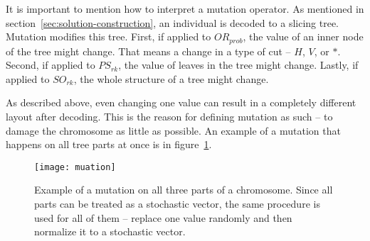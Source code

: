 It is important to mention how to interpret a mutation operator.
As mentioned in section~\ref{sec:solution-construction}, an individual is decoded to a slicing tree.
Mutation modifies this tree.
First, if applied to $OR_{prob}$, the value of an inner node of the tree might change.
That means a change in a type of cut – $H$, $V$, or $*$.
Second, if applied to $PS_{rk}$, the value of leaves in the tree might change.
Lastly, if applied to $SO_{rk}$, the whole structure of a tree might change.

As described above, even changing one value can result in a completely different layout after decoding.
This is the reason for defining mutation as such – to damage the chromosome as little as possible.
An example of a mutation that happens on all tree parts at once is in figure~\ref{fig:mutation}.


\begin{figure}[!htp]
    \texttt{[image: muation]}
    \caption[Example of a mutation on all three parts of a chromosome]{
        Example of a mutation on all three parts of a chromosome.
        Since all parts can be treated as a stochastic vector, the same procedure
        is used for all of them – replace one value randomly and then normalize it to a stochastic vector.
    }
    \label{fig:mutation}
\end{figure}
